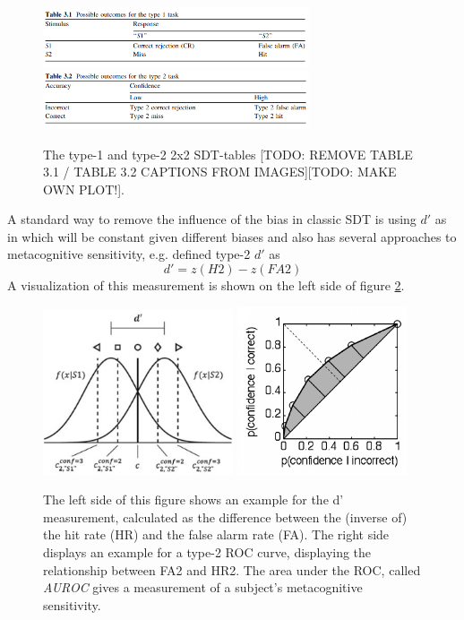 \documentclass[../main/main.tex]{subfiles}
\begin{document}
	\begin{figure}[H]
		\centering
		\captionsetup{justification=centering}
		\includegraphics[width=0.7\textwidth]{../assets/type1_sdt_table.png}
		\includegraphics[width=0.7\textwidth]{../assets/type2_sdt_table.png}
		\caption{The type-1 and type-2 2x2 SDT-tables [TODO: REMOVE TABLE 3.1 / TABLE 3.2 CAPTIONS FROM IMAGES][TODO: MAKE OWN PLOT!].} 
		\label{fig:tables}
	\end{figure}
	A standard way to remove the influence of the bias in classic SDT is using $d'$ as in \cite{green1966signal} which will be constant given different biases and also has several approaches to metacognitive sensitivity, e.g. \cite{kunimoto2001confidence} defined type-2 $d'$ as
	\begin{displaymath}
		d' = z(H2) - z(FA2)
	\end{displaymath}
	A visualization of this measurement is shown on the left side of figure \ref{fig:d_dash_and_roc}.
	\begin{figure}[H]
		\centering
		\captionsetup{justification=centering}
		\includegraphics[width=0.5\textwidth]{../assets/d_dash.png}
		\includegraphics[width=0.45\textwidth]{../assets/type1_roc.png}
		\caption{The left side of this figure shows an example for the d' measurement, calculated as the difference between the (inverse of) the hit rate (HR) and the false alarm rate (FA). The right side displays an example for a type-2 ROC curve, displaying the relationship between FA2 and HR2. The area under the ROC, called \textit{AUROC} gives a measurement of a subject's metacognitive sensitivity.} 
		\label{fig:d_dash_and_roc}
	\end{figure}
\end{document}
